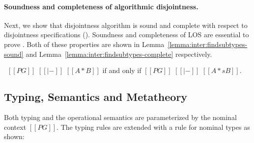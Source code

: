 \paragraph*{Soundness and completeness of algorithmic disjointness.}
Next, we show that disjointness algorithm is sound and complete with respect
to disjointness specifications ().
Soundness and completeness of LOS are essential to
prove . Both of these properties
are shown in Lemma~\ref{lemma:inter:findsubtypes-sound}
and Lemma~\ref{lemma:inter:findsubtypes-complete} respectively.


\begin{theorem}
  \ $[[PG]]$ $[[|-]]$ $[[A * B]]$ if and only if $[[PG]]$ $[[|-]]$ $[[A *s B]]$.
\label{lemma:inter:disj-sound}
\end{theorem}





\subsection{Typing, Semantics and Metatheory}

Both typing and the operational semantics are parameterized by the nominal context $[[PG]]$.
The typing rules are extended with
a rule for nominal types 
as shown:

